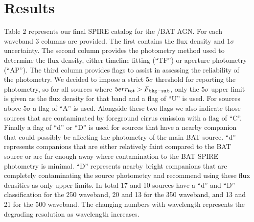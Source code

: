 \section{Results}
Table 2 represents our final SPIRE catalog for the \swift/BAT AGN. For each waveband 3 columns are provided. The first contains the flux density and $1\sigma$ uncertainty. The second column provides the photometry method used to determine the flux density, either timeline fitting (``TF'') or aperture photometry (``AP''). The third column provides flags to assist in assessing the reliability of the photometry. We decided to impose a strict 5$\sigma$ threshold for reporting the photometry, so for all sources where $5 err_{\rm{tot}} > F_{\rm{bkg-sub}}$, only the 5$\sigma$ upper limit is given as the flux density for that band and a flag of ``U'' is used. For sources above $5\sigma$ a flag of ``A'' is used. Alongside these two flags we also indicate those sources that are contaminated by foreground cirrus emission with a flag of ``C''. Finally a flag of ``d'' or ``D'' is used for sources that have a nearby companion that could possibly be affecting the photometry of the main BAT source. ``d'' represents companions that are either relatively faint compared to the BAT source or are far enough away where contamination to the BAT SPIRE photometry is minimal. ``D'' represents nearby bright companions that are completely contaminating the source photometry and recommend using these flux densities as only upper limits. In total 17 and 10 sources have a ``d'' and ``D'' classification for the 250 \um{} waveband, 20 and 13 for the 350 \um{} waveband, and 13 and 21 for the 500 \um{} waveband. The changing numbers with wavelength represents the degrading resolution as wavelength increases.
  